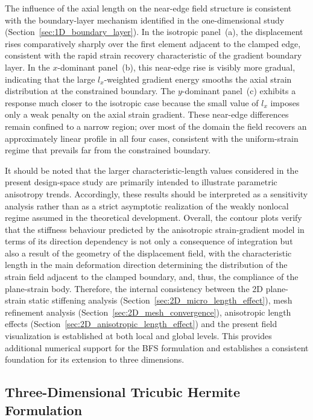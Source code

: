 \documentclass[final,3p,times,fleqn]{elsarticle}
\begin{document}
The influence of the axial length on the near-edge field structure is
consistent with the boundary-layer mechanism identified in the
one-dimensional study (Section~\ref{sec:1D_boundary_layer}).
In the isotropic panel~(a), the displacement rises comparatively
sharply over the first element adjacent to the clamped edge, consistent
with the rapid strain recovery characteristic of the gradient boundary
layer.
In the $x$-dominant panel~(b), this near-edge rise is visibly more
gradual, indicating that the large $l_{x}$-weighted gradient energy
smooths the axial strain distribution at the constrained boundary.
The $y$-dominant panel~(c) exhibits a response much closer to the
isotropic case because the small value of $l_{x}$ imposes only a weak
penalty on the axial strain gradient.
These near-edge differences remain confined to a narrow region; over
most of the domain the field recovers an approximately linear profile
in all four cases, consistent with the uniform-strain regime that
prevails far from the constrained boundary.

It should be noted that the larger characteristic-length values considered
in the present design-space study are primarily intended to illustrate
parametric anisotropy trends. Accordingly, these results should be
interpreted as a sensitivity analysis rather than as a strict asymptotic
realization of the weakly nonlocal regime assumed in the theoretical
development. Overall, the contour plots verify that the stiffness behaviour
predicted by the anisotropic strain-gradient model in terms of its
direction dependency is not only a consequence of integration but also
a result of the geometry of the displacement field, with the
characteristic length in the main deformation direction determining
the distribution of the strain field adjacent to the clamped
boundary, and, thus, the compliance of the plane-strain body.
Therefore, the internal consistency between the 2D plane-strain
static stiffening analysis (Section~\ref{sec:2D_micro_length_effect}),
mesh refinement analysis (Section~\ref{sec:2D_mesh_convergence}),
anisotropic length effects (Section~\ref{sec:2D_anisotropic_length_effect})
and the present field visualization is established at both local and
global levels.
This provides additional numerical support for the BFS formulation and
establishes a consistent foundation for its extension to three dimensions.


\subsection{Three-Dimensional Tricubic Hermite Formulation}
\label{sec:3D_tricubic}
\end{document}
